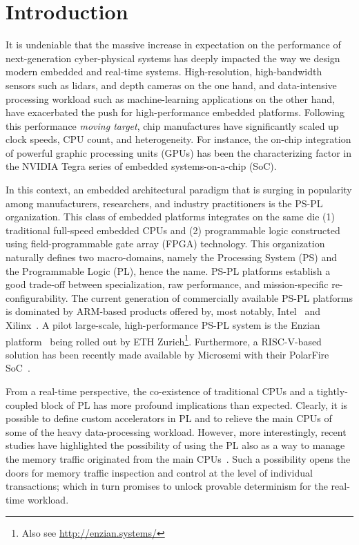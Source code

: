 \section{Introduction}

It is undeniable that the massive increase in expectation on the
performance of next-generation cyber-physical systems has deeply
impacted the way we design modern embedded and real-time
systems. High-resolution, high-bandwidth sensors such as lidars, and
depth cameras on the one hand, and data-intensive processing workload
such as machine-learning applications on the other hand, have
exacerbated the push for high-performance embedded
platforms. Following this performance \emph{moving target}, chip
manufactures have significantly scaled up clock speeds, CPU count, and
heterogeneity. For instance, the on-chip integration of powerful
graphic processing units (GPUs) has been the characterizing factor in
the NVIDIA Tegra series of embedded systems-on-a-chip (SoC).

In this context, an embedded architectural paradigm that is surging in
popularity among manufacturers, researchers, and industry
practitioners is the PS-PL organization. This class of embedded
platforms integrates on the same die (1) traditional full-speed
embedded CPUs and (2) programmable logic constructed using
field-programmable gate array (FPGA) technology. This organization
naturally defines two macro-domains, namely the Processing System (PS)
and the Programmable Logic (PL), hence the name. PS-PL platforms
establish a good trade-off between specialization, raw performance,
and mission-specific re-configurability. The current generation of
commercially available PS-PL platforms is dominated by ARM-based
products offered by, most notably, Intel~\cite{intel_stratix10} and
Xilinx~\cite{zynq_ultrascale}. A pilot large-scale, high-performance PS-PL
system is the Enzian platform~\cite{enzian2020cidr} being rolled out by ETH
Zurich\footnote{Also see \url{http://enzian.systems/}}. Furthermore, a
RISC-V-based solution has been recently made available by Microsemi
with their PolarFire SoC~\cite{microsemi_polarfire}.

From a real-time perspective, the co-existence of traditional CPUs and
a tightly-coupled block of PL has more profound implications than
expected. Clearly, it is possible to define custom accelerators in PL
and to relieve the main CPUs of some of the heavy data-processing
workload. However, more interestingly, recent studies have highlighted the
possibility of using the PL also as a way to manage the memory traffic
originated from the main CPUs~\cite{lime_2018, PLIM20}. Such a
possibility opens the doors for memory traffic inspection and control
at the level of individual transactions; which in turn promises to
unlock provable determinism for the real-time workload.

